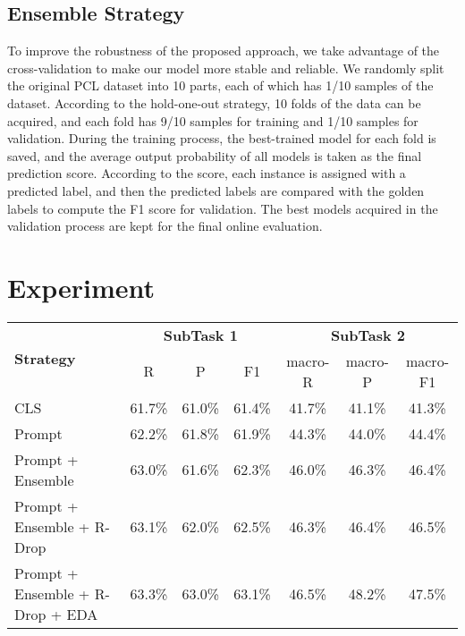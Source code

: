 \documentclass[11pt]{article}
\begin{document}
\subsection{Ensemble Strategy}\label{ensemble}
To improve the robustness of the proposed approach, we take advantage of the cross-validation to make our model more stable and reliable. 
We randomly split the original PCL dataset into 10 parts, each of which has 1/10 samples of the dataset.
According to the hold-one-out strategy, 10 folds of the data can be acquired, and each fold has 9/10 samples for training and 1/10 samples for validation.
During the training process, the best-trained model for each fold is saved, and the average output probability of all models is taken as the final prediction score.
According to the score, each instance is assigned with a predicted label, and then the predicted labels are compared with the golden labels to compute the F1 score for validation.
The best models acquired in the validation process are kept for the final online evaluation.


\section{Experiment}

\begin{table*}
\centering
\begin{tabular}{lcccccc}
\hline
\multirow{2}{*}{\textbf{Strategy}} & \multicolumn{3}{c}{\textbf{SubTask 1}} & \multicolumn{3}{c}{\textbf{SubTask 2}} \\
  & R & P & F1 & macro-R & macro-P & macro-F1  \\
\hline
  CLS                                & 61.7\% & 61.0\% & 61.4\% & 41.7\% & 41.1\% & 41.3\%\\
  Prompt                             & 62.2\% & 61.8\% & 61.9\% & 44.3\% & 44.0\% & 44.4\%\\
  Prompt + Ensemble                  & 63.0\% & 61.6\% & 62.3\% & 46.0\% & 46.3\% & 46.4\%\\
  Prompt + Ensemble + R-Drop         & 63.1\% & 62.0\% & 62.5\% & 46.3\% & 46.4\% & 46.5\%\\
  Prompt + Ensemble + R-Drop + EDA   & 63.3\% & 63.0\% & 63.1\% & 46.5\% & 48.2\% & 47.5\%\\
\hline
\end{tabular}
\begin{tabular}{lc}
\hline
\end{tabular}
\caption{Experimental Results on SubTask 1 and SubTask 2}
\label{tab:tab1}
\end{table*}
\end{document}
